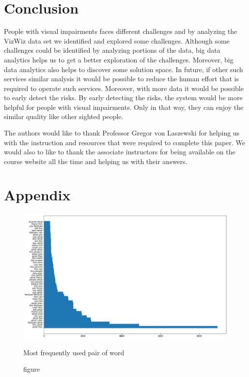 \documentclass[sigconf]{acmart}
\begin{document}
\section{Conclusion}
People with visual impairments faces different challenges and by analyzing the VizWiz data set we identified and explored some challenges. Although some challenges could be identified by analyzing portions of the data, big data analytics helps us to get a better exploration of the challenges. Moreover, big data analytics also helps to discover some solution space. In future, if other such services similar analysis it would be possible to reduce the human effort that is required to operate such services. Moreover, with more data it would be possible to early detect the risks. By early detecting the risks, the system would be more helpful for people with visual impairments. Only in that way, they can enjoy the similar quality like other sighted people. 
\begin{acks}

The authors would like to thank Professor Gregor von Laszewski for helping us with the instruction and resources that were required to complete this paper. We would also to like to thank the associate instructors for being available on the course website all the time and helping us with their answers.

\end{acks}




 
\newpage
\appendix
\section{Appendix}
\begin{figure}[bp]  
    \centering
    
    \includegraphics[scale=0.45]{images/bigram_all.png}
    \caption{figure}{Most frequently used pair of word}
     \label{fig:bi_all}   
\end{figure}
\end{document}
